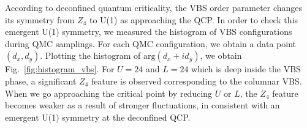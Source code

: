 \documentclass[twocolumn,superscriptaddress]{revtex4-1}
\begin{document}






According to deconfined quantum criticality, the VBS order parameter changes its symmetry from $Z_4$ to U(1) as approaching the QCP. \cite{Senthil2004,*Senthil2004a,*Levin2004} In order to check this emergent U(1) symmetry, we measured the histogram of VBS configurations during QMC samplings. \cite{Sandvik2007} For each QMC configuration, we obtain a data point $(d_x,d_y)$. Plotting the histogram of $\mathrm{arg}(d_x+id_y)$, we obtain Fig.~\ref{fig:histogram_vbs}. For $U=24$ and $L=24$ which is deep inside the VBS phase, a significant $Z_4$ feature is observed corresponding to the columnar VBS. When we go approaching the critical point by reducing $U$ or $L$, the $Z_4$ feature becomes weaker as a result of stronger fluctuations, in consistent with an emergent U(1) symmetry at the deconfined QCP. 
\end{document}
